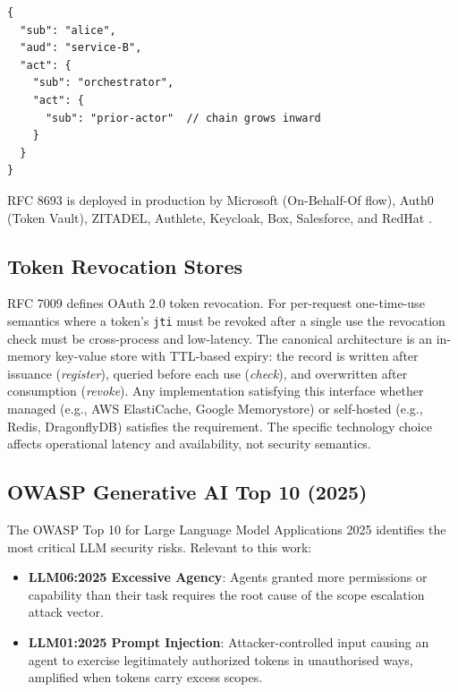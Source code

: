 \documentclass[journal]{IEEEtran}
\begin{document}
\begin{lstlisting}[language={},caption={Nested act claim per RFC 8693 \S 4.1},
                   label={lst:actchain}]
{
  "sub": "alice",
  "aud": "service-B",
  "act": {
    "sub": "orchestrator",
    "act": {
      "sub": "prior-actor"  // chain grows inward
    }
  }
}
\end{lstlisting}

RFC 8693 is deployed in production by Microsoft (On-Behalf-Of flow), Auth0
(Token Vault), ZITADEL, Authlete, Keycloak, Box, Salesforce, and
RedHat \cite{rfc8693_deploy}.

\subsection{Token Revocation Stores}

RFC 7009 \cite{rfc7009} defines OAuth 2.0 token revocation. For per-request
one-time-use semantics where a token's \texttt{jti} must be revoked after a
single use the revocation check must be cross-process and low-latency. The
canonical architecture is an in-memory key-value store with TTL-based expiry:
the record is written after issuance (\textit{register}), queried before each
use (\textit{check}), and overwritten after consumption (\textit{revoke}). Any
implementation satisfying this interface whether managed (e.g., AWS
ElastiCache, Google Memorystore) or self-hosted (e.g., Redis, DragonflyDB) 
satisfies the requirement. The specific technology choice affects operational
latency and availability, not security semantics.

\subsection{OWASP Generative AI Top 10 (2025)}

The OWASP Top 10 for Large Language Model Applications 2025 \cite{owasp_genai}
identifies the most critical LLM security risks. Relevant to this work:
\begin{itemize}
  \item \textbf{LLM06:2025 Excessive Agency}: Agents granted more permissions
        or capability than their task requires the root cause of the scope
        escalation attack vector.
  \item \textbf{LLM01:2025 Prompt Injection}: Attacker-controlled input causing
        an agent to exercise legitimately authorized tokens in unauthorised ways,
        amplified when tokens carry excess scopes.
\end{itemize}
\end{document}
